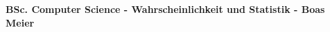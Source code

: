 \documentclass{article}
\begin{document}
\scriptsize

\begin{center}
     \Large{\textbf{BSc. Computer Science - Wahrscheinlichkeit und Statistik - Boas Meier}}
\end{center}

\begin{multicols}{4}
\setlength{\premulticols}{0.5pt}
\setlength{\postmulticols}{0.5pt}
\setlength{\multicolsep}{0.5pt}
\setlength{\columnsep}{0.2pt}
\setlength{\columnseprule}{0.4pt}
\setlength{\intextsep}{0pt}

\begin{flushleft}






\end{flushleft}
\end{multicols}
\end{document}
